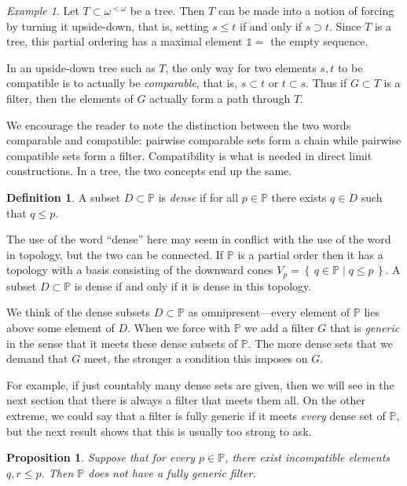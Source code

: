 \documentclass[11pt,oneside,a4paper]{amsbook}
\newcommand{\set}[1]{\left\{\,#1\,\right\}}
\newcommand{\PP}{\mathbb P}
\theoremstyle{definition}
\theoremstyle{plain}
\newtheorem{proposition}[theorem]{Proposition}
\theoremstyle{definition}
\newtheorem{definition}[theorem]{Definition}
\theoremstyle{remark}
\newtheorem{example}[theorem]{Example}
\numberwithin{equation}{section}
\numberwithin{figure}{section}
\begin{document}
\begin{example}
  Let $T\subset\omega^{<\omega}$ be a tree. Then $T$ can be made into a notion of forcing by turning it upside-down, that is, setting $s\leq t$ if and only if $s\supset t$. Since $T$ is a tree, this partial ordering has a maximal element $\mathbb1=$ the empty sequence.

  In an upside-down tree such as $T$, the only way for two elements $s,t$ to be compatible is to actually be \emph{comparable}, that is, $s\subset t$ or $t\subset s$. Thus if $G\subset T$ is a filter, then the elements of $G$ actually form a path through $T$.
\end{example}

We encourage the reader to note the distinction between the two words comparable and compatible: pairwise comparable sets form a chain while pairwise compatible sets form a filter. Compatibility is what is needed in direct limit constructions. In a tree, the two concepts end up the same.

\begin{definition}
  A subset $D\subset\PP$ is \emph{dense} if for all $p\in\PP$ there exists $q\in D$ such that $q\leq p$.
\end{definition}

The use of the word ``dense'' here may seem in conflict  with the use of the word in topology, but the two can be connected. If $\PP$ is a partial order then it has a topology with a basis consisting of the downward cones $V_p=\set{q\in\PP\mid q\leq p}$. A subset $D\subset\PP$ is dense if and only if it is dense in this topology.

We think of the dense subsets $D\subset\PP$ as omnipresent---every element of $\PP$ lies above some element of $D$. When we force with $\PP$ we add a filter $G$ that is \emph{generic} in the sense that it meets these dense subsets of $\PP$. The more dense sets that we demand that $G$ meet, the stronger a condition this imposes on $G$.

For example, if just countably many dense sets are given, then we will see in the next section that there is always a filter that meets them all. On the other extreme, we could say that a filter is fully generic if it meets \emph{every} dense set of $\PP$, but the next result shows that this is usually too strong to ask.

\begin{proposition}
  \label{prop:generic-new}
  Suppose that for every $p\in\PP$, there exist incompatible elements $q,r\leq p$. Then $\PP$ does not have a fully generic filter.
\end{proposition}
\end{document}

